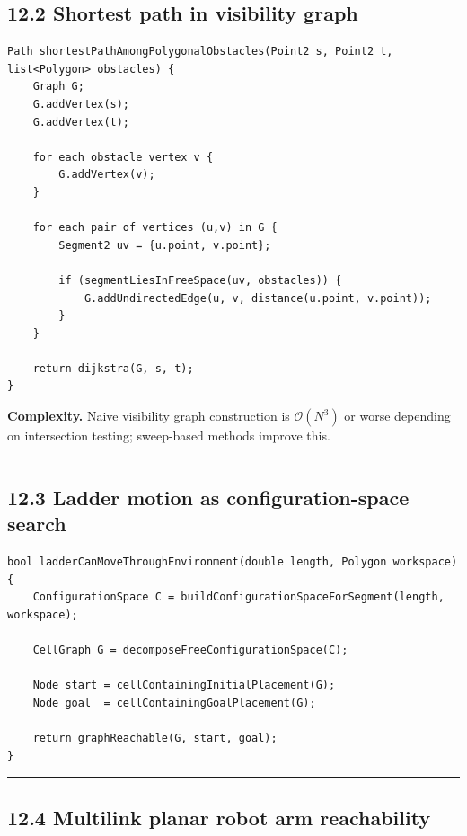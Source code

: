 \documentclass[11pt]{article}
\begin{document}
\subsection{12.2 Shortest path in visibility
graph}\label{shortest-path-in-visibility-graph}

\begin{verbatim}
Path shortestPathAmongPolygonalObstacles(Point2 s, Point2 t, list<Polygon> obstacles) {
    Graph G;
    G.addVertex(s);
    G.addVertex(t);

    for each obstacle vertex v {
        G.addVertex(v);
    }

    for each pair of vertices (u,v) in G {
        Segment2 uv = {u.point, v.point};

        if (segmentLiesInFreeSpace(uv, obstacles)) {
            G.addUndirectedEdge(u, v, distance(u.point, v.point));
        }
    }

    return dijkstra(G, s, t);
}
\end{verbatim}

\textbf{Complexity.} Naive visibility graph construction is
\(\mathcal{O}(N^3)\) or worse depending on intersection
testing; sweep-based methods improve this.

\begin{center}\rule{0.5\linewidth}{0.5pt}\end{center}

\subsection{12.3 Ladder motion as configuration-space
search}\label{ladder-motion-as-configuration-space-search}

\begin{verbatim}
bool ladderCanMoveThroughEnvironment(double length, Polygon workspace) {
    ConfigurationSpace C = buildConfigurationSpaceForSegment(length, workspace);

    CellGraph G = decomposeFreeConfigurationSpace(C);

    Node start = cellContainingInitialPlacement(G);
    Node goal  = cellContainingGoalPlacement(G);

    return graphReachable(G, start, goal);
}
\end{verbatim}

\begin{center}\rule{0.5\linewidth}{0.5pt}\end{center}

\subsection{12.4 Multilink planar robot arm
reachability}\label{multilink-planar-robot-arm-reachability}
\end{document}
